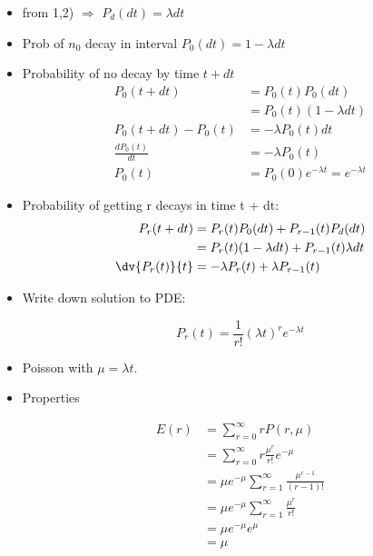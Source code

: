 \begin{itemize}
    \item from 1,2) $\Rightarrow$ $P_d(dt) = \lambda dt$
    \item Prob of $n_0$ decay in interval $P_0(dt) = 1 - \lambda dt$
    \item Probability of no decay by time $t+dt$
          \begin{align*}
              P_0(t+dt)          & = P_0(t) P_0(dt)                         \\
                                 & = P_0(t) (1 - \lambda dt)                \\
              P_0(t+dt) - P_0(t) & = -\lambda P_0(t) dt                     \\
              \frac{dP_0(t)}{dt} & = -\lambda P_0(t)                        \\
              P_0(t)             & = P_0(0) e^{-\lambda t} = e^{-\lambda t}
          \end{align*}
    \item Probability of getting r decays in time t + dt:
          \begin{align*}
              P_r(t+dt)      & = P_r(t) P_0(dt) + P_{r-1}(t) P_d(dt)             \\
                             & = P_r(t) (1 - \lambda dt) + P_{r-1}(t) \lambda dt \\
              \dv{P_r(t)}{t} & = -\lambda P_r(t) + \lambda P_{r-1}(t)            \\
          \end{align*}

    \item Write down solution to PDE:

          \[ P_r(t) = \frac{1}{r!} (\lambda t)^r e^{-\lambda t} \]
    \item Poisson with $\mu = \lambda t$.
    \item Properties

          \begin{align*}
              E(r) & = \sum_{r=0}^{\infty} r P(r,\mu)                            \\
                   & = \sum_{r=0}^{\infty} r \frac{\mu^r}{r!} e^{-\mu}           \\
                   & = \mu e^{-\mu} \sum_{r=1}^{\infty} \frac{\mu^{r-1}}{(r-1)!} \\
                   & = \mu e^{-\mu} \sum_{r=1}^{\infty} \frac{\mu^{r}}{r!}       \\
                   & = \mu e^{-\mu} e^{\mu}                                      \\
                   & = \mu
          \end{align*}


\end{itemize}
